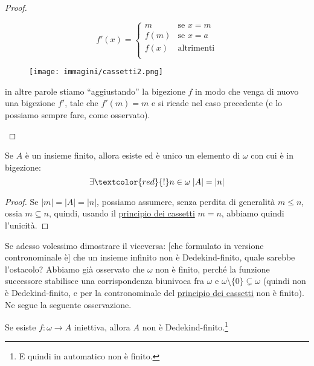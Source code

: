 \documentclass[11pt]{scrartcl}
\begin{document}
\begin{proof}
\begin{itemize}
		\[ f'(x) = \begin{cases}
			m &\text{se $x = m$} \\
			f(m) &\text{se $x = a$} \\
			f(x) &\text{altrimenti} \\
		\end{cases}
			\]
			\begin{figure}[H]
				\centering
				\texttt{[image: immagini/cassetti2.png]}
			\end{figure}
		in altre parole stiamo ``aggiustando'' la bigezione $f$ in modo che venga di nuovo una bigezione $f'$, tale che $f'(m) = m$ e si ricade nel caso precedente (e lo possiamo sempre fare, come osservato).
	\end{itemize}
\end{proof}

\begin{corollary}
	Se $A$ è un insieme finito, allora esiste ed è unico un elemento di $\omega$ con cui è in bigezione:
	\[ \exists \textcolor{red}{!} n \in \omega \; |A| = |n|
		\]
\end{corollary}

\begin{proof}
	Se $|m| = |A| = |n|$, possiamo assumere, senza perdita di generalità $m \leq n$, ossia $m \subseteq n$, quindi, usando il \hyperref[cassetti]{principio dei cassetti} $m = n$, abbiamo quindi l'unicità.
\end{proof}

Se adesso volessimo dimostrare il viceversa: [che formulato in versione contronominale è] che un insieme infinito non è Dedekind-finito, quale sarebbe l'ostacolo? Abbiamo già osservato che $\omega$ non è finito, perché la funzione successore 
stabilisce una corrispondenza biunivoca fra $\omega$ e $\omega \setminus\{0\} \subsetneq \omega$ (quindi non è Dedekind-finito, e per la contronominale del \hyperref[cassetti]{principio dei cassetti} non è finito). Ne segue la seguente osservazione.

\begin{remark}
	\label{omega_Dedekind_finito}
	Se esiste $f : \omega \rightarrow A$ iniettiva, allora $A$ non è Dedekind-finito.\footnote{E quindi in automatico non è finito.}
\end{remark}
\end{document}
